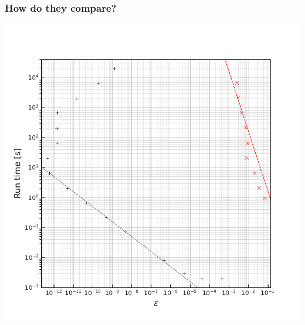 \documentclass{beamer}
\begin{document}
\begin{frame}
    \frametitle{How do they compare?}
    \begin{center}
        \includegraphics[height=0.9\textheight]{figures/Error_vs_runtime}
    \end{center}
\end{frame}
\end{document}
